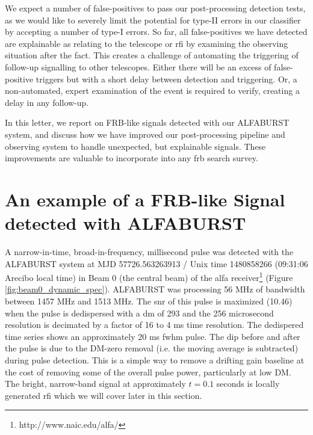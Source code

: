 \documentclass[a4paper,fleqn,usenatbib]{mnras}
\begin{document}
We expect a number of false-positives to pass our post-processing detection
tests, as we would like to severely limit the potential for type-II errors in our
classifier by accepting a number of type-I errors. So far, all false-positives
we have detected are explainable as relating to the telescope or \gls{rfi} by
examining the observing situation after the fact. This creates a challenge of
automating the triggering of follow-up signalling to other telescopes. Either
there will be an excess of false-positive triggers but with a short delay
between detection and triggering. Or, a non-automated, expert examination of the
event is required to verify, creating a delay in any follow-up.

In this letter, we report on FRB-like signals detected with our ALFABURST system,
and discuss how we have improved our post-processing pipeline and observing
system to handle unexpected, but explainable signals. These improvements are
valuable to incorporate into any \gls{frb} search survey.

\section{An example of a FRB-like Signal detected with ALFABURST}
\label{sec:D20161204}

A narrow-in-time, broad-in-frequency, millisecond pulse was detected with the
ALFABURST system at MJD 57726.563263913 / Unix time 1480858266 (09:31:06 Arecibo
local time) in Beam 0 (the central beam) of the \gls{alfa}
receiver\footnote{http://www.naic.edu/alfa/} (Figure
\ref{fig:beam0_dynamic_spec}). ALFABURST was processing 56 MHz of bandwidth
between 1457 MHz and 1513 MHz. The \gls{snr} of this pulse is maximized (10.46)
when the pulse is dedispersed with a \gls{dm} of 293 and the 256 microsecond
resolution is decimated by a factor of 16 to 4 ms time resolution. The
dedispered time series shows an approximately 20 ms \gls{fwhm} pulse. The dip
before and after the pulse is due to the DM-zero removal (i.e. the moving
average is subtracted) during pulse detection. This is a simple way to remove a
drifting gain baseline at the cost of removing some of the overall pulse power,
particularly at low DM. The bright, narrow-band signal at approximately $t=0.1$
seconds is locally generated \gls{rfi} which we will cover later in this
section.
\end{document}
